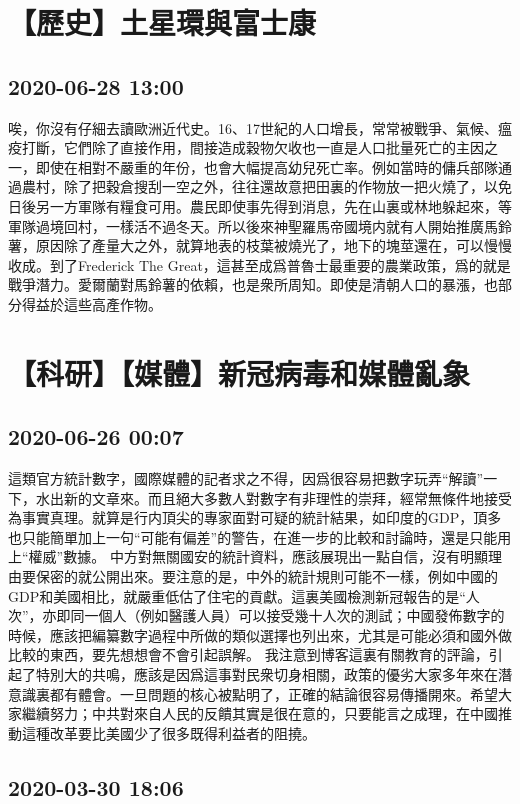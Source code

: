 \documentclass[twocolumn]{ctexart}
\begin{document}
\section*{【歷史】土星環與富士康}
\subsection*{2020-06-28 13:00}
唉，你沒有仔細去讀歐洲近代史。16、17世紀的人口增長，常常被戰爭、氣候、瘟疫打斷，它們除了直接作用，間接造成穀物欠收也一直是人口批量死亡的主因之一，即使在相對不嚴重的年份，也會大幅提高幼兒死亡率。例如當時的傭兵部隊通過農村，除了把穀倉搜刮一空之外，往往還故意把田裏的作物放一把火燒了，以免日後另一方軍隊有糧食可用。農民即使事先得到消息，先在山裏或林地躲起來，等軍隊過境回村，一樣活不過冬天。所以後來神聖羅馬帝國境内就有人開始推廣馬鈴薯，原因除了產量大之外，就算地表的枝葉被燒光了，地下的塊莖還在，可以慢慢收成。到了Frederick The Great，這甚至成爲普魯士最重要的農業政策，爲的就是戰爭潛力。愛爾蘭對馬鈴薯的依賴，也是衆所周知。即使是清朝人口的暴漲，也部分得益於這些高產作物。\section*{【科研】【媒體】新冠病毒和媒體亂象}
\subsection*{2020-06-26 00:07}

這類官方統計數字，國際媒體的記者求之不得，因爲很容易把數字玩弄“解讀”一下，水出新的文章來。而且絕大多數人對數字有非理性的崇拜，經常無條件地接受為事實真理。就算是行内頂尖的專家面對可疑的統計結果，如印度的GDP，頂多也只能簡單加上一句“可能有偏差”的警告，在進一步的比較和討論時，還是只能用上“權威”數據。
中方對無關國安的統計資料，應該展現出一點自信，沒有明顯理由要保密的就公開出來。要注意的是，中外的統計規則可能不一樣，例如中國的GDP和美國相比，就嚴重低估了住宅的貢獻。這裏美國檢測新冠報告的是“人次”，亦即同一個人（例如醫護人員）可以接受幾十人次的測試；中國發佈數字的時候，應該把編纂數字過程中所做的類似選擇也列出來，尤其是可能必須和國外做比較的東西，要先想想會不會引起誤解。
我注意到博客這裏有關教育的評論，引起了特別大的共鳴，應該是因爲這事對民衆切身相關，政策的優劣大家多年來在潛意識裏都有體會。一旦問題的核心被點明了，正確的結論很容易傳播開來。希望大家繼續努力；中共對來自人民的反饋其實是很在意的，只要能言之成理，在中國推動這種改革要比美國少了很多既得利益者的阻撓。
\subsection*{2020-03-30 18:06}
\end{document}
